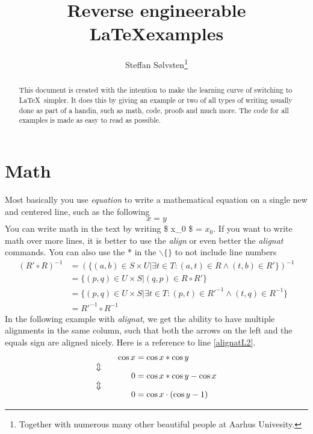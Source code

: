\documentclass[a4, english]{article}
\title{{\LARGE Reverse engineerable \LaTeX examples}}
\author{Steffan Sølvsten\footnote{Together with numerous many other beautiful
    people at Aarhus Univesity.}}
\affil{Aarhus University \\ \mailto{soelvsten@cs.au.dk}}
\begin{document}
\maketitle

\begin{abstract}
  This document is created with the intention to make the learning curve of
  switching to \LaTeX\ simpler. It does this by giving an example or two of all
  types of writing usually done as part of a handin, such as math, code, proofs
  and much more. The code for all examples is made as easy to read as possible.
\end{abstract}

\tableofcontents

\newpage
\section{Math} \label{sec:math}
Most basically you use \emph{equation} to write a mathematical equation on a
single new and centered line, such as the following
\begin{equation}
  x = y
\end{equation}
You can write math in the text by writing \$ x\_0 \$ = $x_0$. If you want to
write math over more lines, it is better to use the \emph{align} or even better
the \emph{alignat} commands. You can also use the * in the
$\backslash$$\{$$\}$ to not include line numbers
\begin{align*}
  (R' \circ R)^{-1}
    &= (\{(a,b) \in S \times U | \exists t \in T: (a,t) \in R \wedge (t,b) \in R'\})^{-1}
\\
    &= \{(p,q) \in U \times S | (q,p) \in R \circ R' \}
\\
    &= \{(p,q) \in U \times S | \exists t \in T : (p,t) \in R'^{-1} \wedge (t,q) \in R^{-1}\}
\\
    &= R'^{-1} \circ R^{-1}
\end{align*}
In the following example with \emph{alignat}, we get the ability to have
multiple alignments in the same column, such that both the arrows on the left
and the equals sign are aligned nicely. Here is a reference to line
\ref{alignatL2}.
\begin{alignat}{2}
    && \cos x &= \cos x * \cos y \label{alignatL1}
\\ \ArrowBetweenLines
    && 0 &= \cos x * \cos y - \cos x \label{alignatL2}
\\ \ArrowBetweenLines
    && 0 &= \cos x \cdot (\cos y - 1) \label{alignatL3}
\end{alignat}
\end{document}
